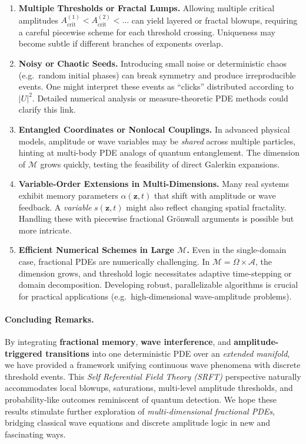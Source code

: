 \documentclass[12pt]{article}
\begin{document}
\begin{enumerate}
\item \textbf{Multiple Thresholds or Fractal Lumps.} 
  Allowing multiple critical amplitudes $A_{\mathrm{crit}}^{(1)}<A_{\mathrm{crit}}^{(2)}<\dots$ 
  can yield layered or fractal blowups, requiring a careful piecewise scheme for each 
  threshold crossing. Uniqueness may become subtle if different branches of exponents 
  overlap.

\item \textbf{Noisy or Chaotic Seeds.} 
  Introducing small noise or deterministic chaos (e.g.\ random initial phases) can break 
  symmetry and produce irreproducible events. One might interpret these events as 
  “clicks” distributed according to $|U|^2$. Detailed numerical analysis or measure-theoretic 
  PDE methods could clarify this link.

\item \textbf{Entangled Coordinates or Nonlocal Couplings.}
  In advanced physical models, amplitude or wave variables may be \emph{shared} across 
  multiple particles, hinting at multi-body PDE analogs of quantum entanglement. The 
  dimension of $\mathcal{M}$ grows quickly, testing the feasibility of direct Galerkin 
  expansions.

\item \textbf{Variable-Order Extensions in Multi-Dimensions.} 
  Many real systems exhibit memory parameters $\alpha(\mathbf{z},t)$ that shift with 
  amplitude or wave feedback. A \emph{variable} $s(\mathbf{z},t)$ might also reflect 
  changing spatial fractality. Handling these with piecewise fractional Grönwall arguments 
  is possible but more intricate.

\item \textbf{Efficient Numerical Schemes in Large \(\mathcal{M}\).}
  Even in the single-domain case, fractional PDEs are numerically challenging. In 
  $\mathcal{M}=\Omega\times\mathcal{A}$, the dimension grows, and threshold logic 
  necessitates adaptive time-stepping or domain decomposition. Developing robust, 
  parallelizable algorithms is crucial for practical applications (e.g.\ high-dimensional 
  wave-amplitude problems).
\end{enumerate}

\paragraph{Concluding Remarks.}
By integrating \textbf{fractional memory}, \textbf{wave interference}, and 
\textbf{amplitude-triggered transitions} into one deterministic PDE over an 
\emph{extended manifold}, we have provided a framework unifying continuous wave phenomena 
with discrete threshold events. This \emph{Self Referential Field Theory (SRFT)} perspective 
naturally accommodates local blowups, saturations, multi-level amplitude thresholds, and 
probability-like outcomes reminiscent of quantum detection. We hope these results stimulate 
further exploration of \emph{multi-dimensional fractional PDEs}, bridging classical 
wave equations and discrete amplitude logic in new and fascinating ways.
\end{document}
